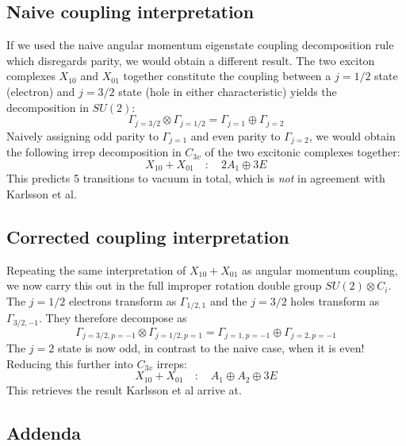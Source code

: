 \documentclass[12pt]{article}
\begin{document}
	\subsection{Naive coupling interpretation}
	If we used the naive angular momentum eigenstate coupling decomposition rule which disregards parity, we would obtain a different result. The two exciton complexes $X_{10}$ and $X_{01}$ together constitute the coupling between a $j=1/2$ state (electron) and $j=3/2$ state (hole in either characteristic) yields the decomposition in $SU(2)$:
	$$\Gamma_{j=3/2}\otimes \Gamma_{j=1/2} = \Gamma_{j=1}\oplus \Gamma_{j=2}$$
	Naively assigning odd parity to $\Gamma_{j=1}$ and even parity to $\Gamma_{j=2}$, we would obtain the following irrep decomposition in $C_{3v}$ of the two excitonic complexes together:
	$$X_{10} + X_{01} \quad : \quad 2A_1 \oplus 3E$$
	This predicts 5 transitions to vacuum in total, which is \textit{not} in agreement with Karlsson et al.
	
	\subsection{Corrected coupling interpretation}
	Repeating the same interpretation of $X_{10}+X_{01}$ as angular momentum coupling, we now carry this out in the full improper rotation double group $SU(2)\otimes C_i$. The $j=1/2$ electrons transform as $\Gamma_{1/2,1}$ and the $j=3/2$ holes transform as $\Gamma_{3/2, -1}$. They therefore decompose as
	$$\Gamma_{j=3/2,p=-1}\otimes \Gamma_{j=1/2, p=1} = \Gamma_{j=1, p=-1}\oplus \Gamma_{j=2, p=-1}$$
	The $j=2$ state is now odd, in contrast to the naive case, when it is even! Reducing this further into $C_{3v}$ irreps:
	$$X_{10} + X_{01} \quad : \quad A_1 \oplus A_2 \oplus 3E$$
	This retrieves the result Karlsson et al arrive at.
	
	\subsection{Addenda}
\end{document}
